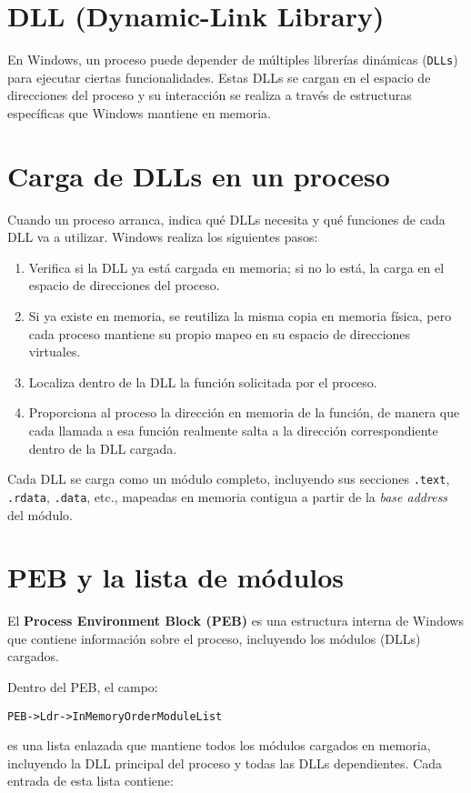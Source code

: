 \section{DLL (Dynamic-Link Library)}
En Windows, un proceso puede depender de múltiples librerías dinámicas 
(\texttt{DLLs}) para ejecutar ciertas funcionalidades. Estas DLLs se cargan en 
el espacio de direcciones del proceso y su interacción se realiza a través de 
estructuras específicas que Windows mantiene en memoria.

\section{Carga de DLLs en un proceso}
Cuando un proceso arranca, indica qué DLLs necesita y qué funciones de cada DLL 
va a utilizar. Windows realiza los siguientes pasos:

\begin{enumerate}
    \item Verifica si la DLL ya está cargada en memoria; si no lo está, la carga 
    en el espacio de direcciones del proceso.
    \item Si ya existe en memoria, se reutiliza la misma copia en memoria física, 
    pero cada proceso mantiene su propio mapeo en su espacio de direcciones virtuales.
    \item Localiza dentro de la DLL la función solicitada por el proceso.
    \item Proporciona al proceso la dirección en memoria de la función, de 
    manera que cada llamada a esa función realmente salta a la dirección 
    correspondiente dentro de la DLL cargada.
\end{enumerate}

Cada DLL se carga como un módulo completo, incluyendo sus secciones 
\texttt{.text}, \texttt{.rdata}, \texttt{.data}, etc., mapeadas en memoria 
contigua a partir de la \emph{base address} del módulo.

\section{PEB y la lista de módulos}
El \textbf{Process Environment Block (PEB)} es una estructura interna de Windows 
que contiene información sobre el proceso, incluyendo los módulos (DLLs) 
cargados. 

Dentro del PEB, el campo:
\begin{verbatim}
PEB->Ldr->InMemoryOrderModuleList
\end{verbatim}
es una lista enlazada que mantiene todos los módulos cargados en memoria, 
incluyendo la DLL principal del proceso y todas las DLLs dependientes. Cada 
entrada de esta lista contiene:

